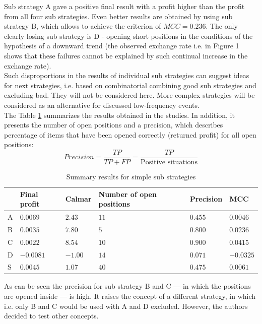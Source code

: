 \documentclass{jtacs}
\begin{document}
Sub strategy A gave a positive final result with a profit higher than the profit from all four sub strategies. Even better results are obtained by using sub strategy B, which allows to achieve the criterion of $MCC = 0.236$.
The only clearly losing sub strategy is D - opening short positions in the conditions of the hypothesis of a downward trend (the observed exchange rate i.e. in  Figure 1 shows that these failures cannot be explained by such continual increase in the exchange rate).\\
Such disproportions in the results of individual sub strategies can suggest ideas for next strategies, i.e. based on combinatorial combining good sub strategies and excluding bad. They will not be considered here.  More complex strategies will be considered as an alternative for discussed low-frequency events.\\
The Table \ref{tab6} summarizes the results obtained in the studies. In addition, it presents the  number of open positions and a precision, which describes percentage of items that have been opened correctly (returned profit) for all open positions:
\begin{equation}
Precision = \frac{TP}{TP+FP} = \frac{TP}{\text{Positive situations}}
\end{equation}
\begin{table}[ht]
\centering
\caption{Summary results for simple sub strategies}
\label{tab6}
\begin{tabular}{|l|l|l|l|l|l|}\hline
&	Final profit &	Calmar	& Number of open positions	& Precision & 	MCC \\ \hline
A&	$0.0069$ &	$2.43$ &	$11$ &	$0.455$ &	$0.0046$ \\ \hline
B&	$0.0035$ &	$7.80$ &	$5$ &	$0.800$ &	$0.0236$ \\ \hline
C&	$0.0022$ &	$8.54$ &	$10$ &	$0.900$ &	$0.0415$ \\ \hline
D&	$-0.0081$ &	$-1.00$ &	$14$ &	$0.071$ &	$-0.0325$ \\ \hline
S&	$0.0045$ &	$1.07$ &	$40$ &	$0.475$ &	$0.0061$ \\ \hline
\end{tabular}
\end{table}
\FloatBarrier
As can be seen the precision for sub strategy B and C --- in which the positions are opened inside --- is high. It raises the concept of a different strategy, in which i.e. only B and C would be used with A and D excluded. However, the authors decided to test other concepts.

\end{document}
